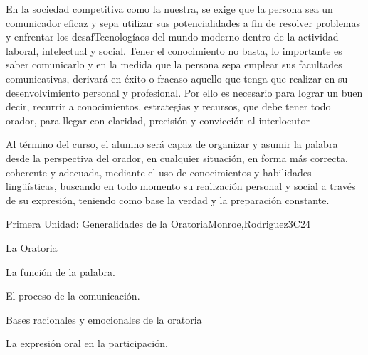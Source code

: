 \begin{syllabus}


\begin{justification}
En la sociedad competitiva como la nuestra,  se exige que la persona sea un comunicador eficaz y  sepa utilizar sus potencialidades a fin de resolver problemas y enfrentar los desafTecnologíaos del mundo moderno dentro de la actividad laboral, intelectual y social. Tener el conocimiento no basta, lo importante es saber comunicarlo y en la medida que la persona sepa emplear sus facultades comunicativas, derivará en éxito o fracaso aquello que tenga que realizar en su desenvolvimiento personal y profesional. Por ello es necesario para lograr un buen decir, recurrir a conocimientos, estrategias y recursos, que debe tener todo orador, para llegar con claridad, precisión y convicción al interlocutor
\end{justification}

\begin{goals}
\item Al término del curso, el alumno será capaz de organizar y asumir la palabra desde la perspectiva del orador, en cualquier situación, en forma más correcta, coherente  y adecuada, mediante el uso de conocimientos y habilidades lingüísticas, buscando en todo momento su realización personal y social  a través de su expresión, teniendo como base  la verdad y la preparación constante.
\end{goals}

\begin{outcomes}
    \item {}
    \item {}
    \item {}
\end{outcomes}

\begin{competences}
    \item {}
    \item {}
\end{competences}

\begin{unit}{}{Primera Unidad: Generalidades de la Oratoria}{Monroe,Rodriguez}{3}{C24}
\begin{topics}
	\item La Oratoria
	\item La función de la palabra.
	\item El proceso de la comunicación.
	\item Bases racionales y emocionales de la oratoria
		\begin{subtopics}
			\item La expresión oral en la participación.
		\end{subtopics}


\end{topics}
\end{unit}
\end{syllabus}
